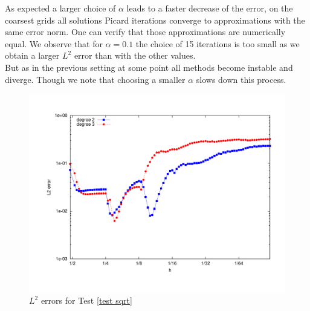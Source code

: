 As expected a larger choice of $\alpha$ leads to a faster decrease of the error, on the coarsest grids all solutions Picard iterations converge to approximations with the same error norm. One can verify that those approximations are numerically equal. We observe that for $\alpha=0.1$ the choice of 15 iterations is too small as we obtain a larger $L^2$ error than with the other values.\\
But as in the previous setting at some point all methods become instable and diverge. Though we note that choosing a smaller $\alpha$ slows down this process. 

  \begin{figure}[H]
  	\centering
  	\includegraphics[scale =0.37]{plots/MA3.pdf}
  	\caption{$L^2$ errors for Test \ref{test sqrt}}
  	\label{fig: l2 errors test sqrt ourMethod}
  \end{figure}
  
